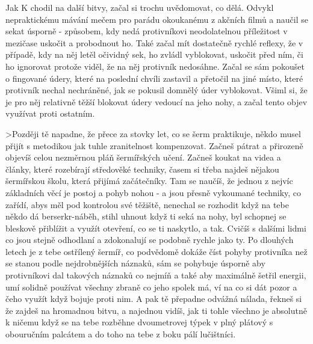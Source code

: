Jak K chodil na další bitvy, začal si trochu uvědomovat, co dělá. Odvykl nepraktickému mávání mečem pro parádu okoukanému z akčních filmů a naučil se sekat úsporně - způsobem, kdy nedá protivníkovi neodolatelnou příležitost v mezičase uskočit a probodnout ho. Také začal mít dostatečně rychlé reflexy, že v případě, kdy na něj letěl očividný sek, ho zvládl vyblokovat, uskočit před ním, či ho ignorovat protože viděl, že na něj protivník nedosáhne. Začal se sám pokoušet o fingované údery, které na poslední chvíli zastavil a přetočil na jiné místo, které protivník nechal nechráněné, jak se pokusil domnělý úder vyblokovat. Všiml si, že je pro něj relativně těžší blokovat údery vedoucí na jeho nohy, a začal tento objev využívat proti ostatním.



>Později tě napadne, že přece za stovky let, co se šerm praktikuje, někdo musel přijít s metodikou jak tuhle zranitelnost kompenzovat. Začneš pátrat a přirozeně objevíš celou nezměrnou pláň šermířských učení. Začneš koukat na videa a články, které rozebírají středověké techniky, časem si třeba najdeš nějakou šermířskou školu, která přijímá začátečníky. Tam se naučíš, že jednou z nejvíc základních věcí je postoj a pohyb nohou - a jsou přesně vykoumané techniky, co zařídí, abys měl pod kontrolou své těžiště, nenechal se rozhodit když na tebe někdo dá berserkr-náběh, stihl uhnout když ti seká na nohy, byl schopnej se bleskově přiblížit a využít otevření, co se ti naskytlo, a tak. Cvičíš s dalšími lidmi co jsou stejně odhodlaní a zdokonalují se podobně rychle jako ty. Po dlouhých letech je z tebe ostřílený šermíř, co podvědomě dokáže číst pohyby protivníka než se stanou podle nejdrobnějších náznaků, sám se pohybuje úsporně aby protivníkovi dal takových náznaků co nejmíň a také aby maximálně šetřil energii, umí solidně používat všechny zbraně co jeho spolek má, ví na co si dát pozor a čeho využít když bojuje proti nim. A pak tě přepadne odvážná nálada, řekneš si že zajdeš na hromadnou bitvu, a najednou vidíš, jak ti tohle všechno je absolutně k ničemu když se na tebe rozběhne dvoumetrovej týpek v plný plátový s obouručním palcátem a do toho na tebe z boku pálí lučištníci. 



